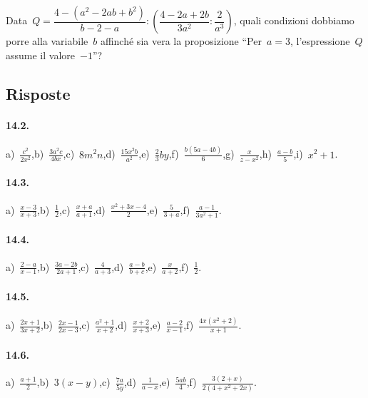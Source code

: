 \begin{esercizio}[\Ast]
\label{ese:14.66}
Data~$Q=\dfrac{4-\left(a^{2}-2ab+b^{2}\right)}{b-2-a}:\left(\dfrac{4-2a+2b}{3a^{2}}:\dfrac{2}{a^{3}}\right)$,
quali condizioni dobbiamo porre alla variabile~$b$ affinché sia vera la proposizione ``Per~$a = 3$, l’espressione~$Q$ assume il valore~$-1$''?
\end{esercizio}

\subsection{Risposte}

\paragraph{14.2.}
a)~$\frac{c^{2}}{2x^{2}}$,\quad b)~$\frac{3a^{2}c}{4bx}$,\quad c)~$8m^{2}n$,\quad d)~$\frac{15x^{2}b}{a^{2}}$,\quad e)~$\frac{2}{3}by$,\quad f)~$\frac{b(5a-4b)}{6}$,\quad g)~$\frac{x}{z-x^{2}}$,\quad h)~$\frac{a-b}{5}$,\quad i)~$x^{2}+1$.

\paragraph{14.3.}
a)~$\frac{x-3}{x+3}$,\quad b)~$\frac{1}{2}$,\quad c)~$\frac{x+a}{a+1}$,\quad d)~$\frac{x^{2}+3x-4}{2}$,\quad e)~$\frac{5}{3+a}$,\quad f)~$\frac{a-1}{3a^{2}+1}$.

\paragraph{14.4.}
a)~$\frac{2-a}{x-1}$,\quad b)~$\frac{3a-2b}{2a+1}$,\quad c)~$\frac{4}{a+3}$,\quad d)~$\frac{a-b}{b+c}$,\quad e)~$\frac{x}{a+2}$,\quad f)~$\frac{1}{2}$.

\paragraph{14.5.}
a)~$\frac{2x+1}{3x+2}$,\quad b)~$\frac{2x-1}{2x-3}$,\quad c)~$\frac{a^2+1}{x+2}$,\quad d)~$\frac{x+2}{x+3}$,\quad e)~$\frac{a-2}{x-1}$,\quad f)~$\frac{4x\left(x^2+2\right)}{x+1}$.

\paragraph{14.6.}
a)~$\frac{a+1}{2}$,\quad b)~$3(x-y)$,\quad c)~$\frac{7a}{5y}$,\quad d)~$\frac{1}{a-x}$,\quad e)~$\frac{5ab}{4}$,\quad f)~$\frac{3(2+x)}{2\left(4+x^{2}+2x\right)}$.

